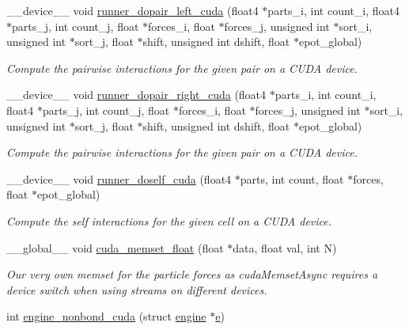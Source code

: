 \begin{DoxyCompactItemize}
\-\_\-\-\_\-device\-\_\-\-\_\- void \hyperlink{runner__cuda_8cu_ac0ad184f688f3a3b79c58f73f642b611}{runner\-\_\-dopair\-\_\-left\-\_\-cuda} (float4 $\ast$parts\-\_\-i, int count\-\_\-i, float4 $\ast$parts\-\_\-j, int count\-\_\-j, float $\ast$forces\-\_\-i, float $\ast$forces\-\_\-j, unsigned int $\ast$sort\-\_\-i, unsigned int $\ast$sort\-\_\-j, float $\ast$shift, unsigned int dshift, float $\ast$epot\-\_\-global)
\begin{DoxyCompactList}\small\item\em Compute the pairwise interactions for the given pair on a C\-U\-D\-A device. \end{DoxyCompactList}\item 
\-\_\-\-\_\-device\-\_\-\-\_\- void \hyperlink{runner__cuda_8cu_a3dd671b11851b775b5fef7b8ae178c9e}{runner\-\_\-dopair\-\_\-right\-\_\-cuda} (float4 $\ast$parts\-\_\-i, int count\-\_\-i, float4 $\ast$parts\-\_\-j, int count\-\_\-j, float $\ast$forces\-\_\-i, float $\ast$forces\-\_\-j, unsigned int $\ast$sort\-\_\-i, unsigned int $\ast$sort\-\_\-j, float $\ast$shift, unsigned int dshift, float $\ast$epot\-\_\-global)
\begin{DoxyCompactList}\small\item\em Compute the pairwise interactions for the given pair on a C\-U\-D\-A device. \end{DoxyCompactList}\item 
\-\_\-\-\_\-device\-\_\-\-\_\- void \hyperlink{runner__cuda_8cu_a1c924aa03f90fa43d741e4b95ac4f185}{runner\-\_\-doself\-\_\-cuda} (float4 $\ast$parts, int count, float $\ast$forces, float $\ast$epot\-\_\-global)
\begin{DoxyCompactList}\small\item\em Compute the self interactions for the given cell on a C\-U\-D\-A device. \end{DoxyCompactList}\item 
\-\_\-\-\_\-global\-\_\-\-\_\- void \hyperlink{runner__cuda_8cu_a3e3d193762e74ec5046ce21883c869ca}{cuda\-\_\-memset\-\_\-float} (float $\ast$data, float val, int N)
\begin{DoxyCompactList}\small\item\em Our very own memset for the particle forces as cuda\-Memset\-Async requires a device switch when using streams on different devices. \end{DoxyCompactList}\item 
int \hyperlink{runner__cuda_8cu_abdd3e423279f5335dea30af84aa539a1}{engine\-\_\-nonbond\-\_\-cuda} (struct \hyperlink{structengine}{engine} $\ast$\hyperlink{potential__eval_8h_ac54d1391e6657558123088943f721021}{e})

\end{DoxyCompactItemize}
